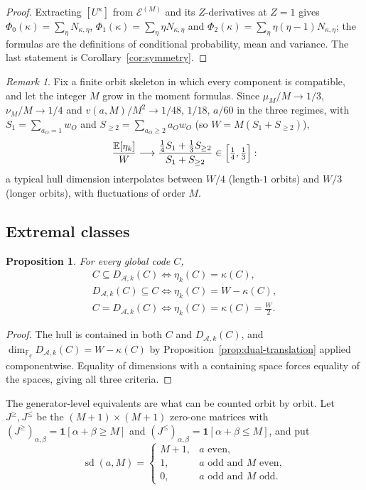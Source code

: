 \documentclass[preprint,12pt,a4paper]{elsarticle}
\newcommand{\F}{\mathbb F}
\newcommand{\A}{\mathcal A}
\newcommand{\Epoly}{\mathscr E}
\newtheorem{proposition}[theorem]{Proposition}
\theoremstyle{definition}
\theoremstyle{remark}
\newtheorem{remark}[theorem]{Remark}
\begin{document}
\begin{proof}
Extracting $[U^\kappa]$ from $\Epoly^{(M)}$ and its $Z$-derivatives at $Z=1$
gives $\Phi_0(\kappa)=\sum_\eta N_{\kappa,\eta}$,
$\Phi_1(\kappa)=\sum_\eta\eta N_{\kappa,\eta}$ and
$\Phi_2(\kappa)=\sum_\eta\eta(\eta-1)N_{\kappa,\eta}$; the formulas are the
definitions of conditional probability, mean and variance.  The last statement
is Corollary~\ref{cor:symmetry}.
\end{proof}

\begin{remark}\label{rem:asymptotic-moments}
Fix a finite orbit skeleton in which every component is compatible, and let the integer $M$ grow in the
moment formulas.  Since
$\mu_M/M\to1/3$, $\nu_M/M\to1/4$ and $v(a,M)/M^2\to1/48$, $1/18$, $a/60$ in the
three regimes, with $S_1=\sum_{a_O=1}w_O$ and
$S_{\geq2}=\sum_{a_O\geq2}a_Ow_O$ (so $W=M(S_1+S_{\geq2})$),
{\small
\[
\frac{\mathbb{E}[\eta_k]}{W}\longrightarrow
 \frac{\tfrac14S_1+\tfrac13S_{\geq2}}{S_1+S_{\geq2}}\in\Bigl[\tfrac14,\tfrac13\Bigr]:
\]
}
a typical hull dimension interpolates between $W/4$ (length-$1$ orbits) and
$W/3$ (longer orbits), with fluctuations of order $M$.
\end{remark}

\subsection{Extremal classes}\label{sec:extremal}

\begin{proposition}\label{prop:dimension-criteria}
For every global code $C$,
\[
\begin{gathered}
C\subseteq D_{\A,k}(C)
\iff \eta_k(C)=\kappa(C),\\[5pt]
D_{\A,k}(C)\subseteq C
\iff \eta_k(C)=W-\kappa(C),\\[5pt]
C=D_{\A,k}(C)
\iff \eta_k(C)=\kappa(C)=\frac{W}{2}.
\end{gathered}
\]
\end{proposition}

\begin{proof}
The hull is contained in both $C$ and $D_{\A,k}(C)$, and
$\dim_{\F_q}D_{\A,k}(C)=W-\kappa(C)$ by
Proposition~\ref{prop:dual-translation} applied componentwise.  Equality of
dimensions with a containing space forces equality of the spaces, giving all
three criteria.
\end{proof}

The generator-level equivalents are what can be counted orbit by orbit.  Let
$J^{\geq},J^{\leq}$ be the $(M+1)\times(M+1)$ zero-one matrices with
$(J^{\geq})_{\alpha,\beta}=\mathbf{1}[\alpha+\beta\geq M]$ and
$(J^{\leq})_{\alpha,\beta}=\mathbf{1}[\alpha+\beta\leq M]$, and put
{\small
\[
\operatorname{sd}(a,M)=
\begin{cases}
M+1,&a\text{ even},\\
1,&a\text{ odd and }M\text{ even},\\
0,&a\text{ odd and }M\text{ odd}.
\end{cases}
\]
}
\end{document}
